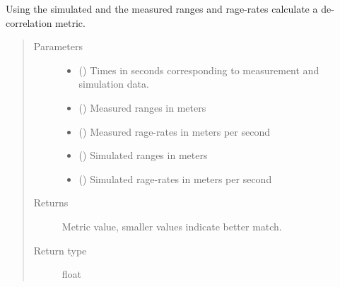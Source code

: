 \documentclass[letterpaper,10pt,english]{sphinxmanual}
\begin{document}
\begin{fulllineitems}
\label{\detokenize{modules/correlator:correlator.residual_distribution_metric}}
Using the simulated and the measured ranges and rage-rates calculate a de-correlation metric.
\begin{quote}\begin{description}
\item[{Parameters}] \leavevmode\begin{itemize}
\item {} 
 () \textendash{} Times in seconds corresponding to measurement and simulation data.

\item {} 
 () \textendash{} Measured ranges in meters

\item {} 
 () \textendash{} Measured rage-rates in meters per second

\item {} 
 () \textendash{} Simulated ranges in meters

\item {} 
 () \textendash{} Simulated rage-rates in meters per second

\end{itemize}

\item[{Returns}] \leavevmode
Metric value, smaller values indicate better match.

\item[{Return type}] \leavevmode
float

\end{description}\end{quote}

\end{fulllineitems}
\end{document}
